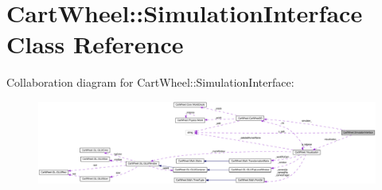 \hypertarget{classCartWheel_1_1SimulationInterface}{
\section{CartWheel::SimulationInterface Class Reference}
\label{classCartWheel_1_1SimulationInterface}
}


Collaboration diagram for CartWheel::SimulationInterface:\nopagebreak
\begin{figure}[H]
\begin{center}
\leavevmode
\includegraphics[width=400pt]{classCartWheel_1_1SimulationInterface__coll__graph}
\end{center}
\end{figure}
